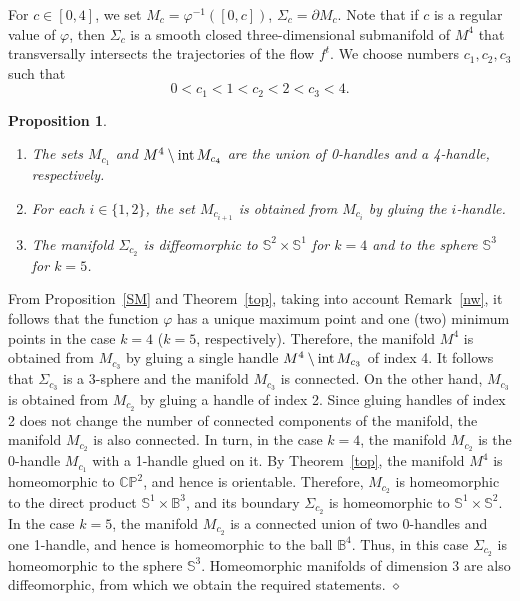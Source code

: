 \documentclass[%
 aip,
 amsmath,amssymb,
preprint,%
]{revtex4-1}
\newtheorem{propos}{Proposition}
\newenvironment{proof}{{\bf Proof:}}
{\hfill $\diamond$\medskip}
\begin{document}
For $c\in [0,4]$, we set $M_c=\varphi^{-1}([0,c])$, $\Sigma_c=\partial M_c$. Note that if $c$ is a regular value of $\varphi$, then $\Sigma_{c}$ is a smooth closed three-dimensional submanifold of $M^4$ that transversally intersects the trajectories of the flow $f^t$. We choose numbers $c_1, c_2, c_3$ such that
\begin{equation}\label{const}
0<c_1<1<c_2<2<c_3<4.
\end{equation}

\begin{propos}\label{hd}
\begin{enumerate}
\item The sets $M_{c_1}$ and $M^4\setminus {\rm int}\,  M_{c_4}$ are the union of 0-handles and a 4-handle, respectively.
\item For each $i\in \{1,2\}$, the set $M_{c_{i+1}}$ is obtained from $M_{c_{i}}$ by gluing the $i$-handle.

\item The manifold
$\Sigma_{c_2}$ is diffeomorphic to $\mathbb S^2\times \mathbb S^1$ for $k=4$ and to the sphere $\mathbb S^3$ for $k=5$.
\end{enumerate}
\end{propos}
\begin{proof}
From Proposition~\ref{SM} and Theorem~\ref{top}, taking into account Remark~\ref{nw}, it follows that the function $\varphi$ has a unique maximum point and one (two) minimum points in the case $k=4$ ($k=5$, respectively). Therefore, the manifold $M^4$ is obtained from $M_{c_3}$ by gluing a single handle $M^4\setminus {\rm int}\, M_{c_3}$ of index 4. It follows that $\Sigma_{c_3}$ is a $3$-sphere and the manifold $M_{c_3}$ is connected. On the other hand, $M_{c_3}$ is obtained from $M_{c_2}$ by gluing a handle of index 2. Since gluing handles of index 2 does not change the number of connected components of the manifold, the manifold $M_{c_2}$ is also connected. In turn, in the case $k=4$, the manifold $M_{c_2}$ is the $0$-handle  $M_{c_1}$ with a 1-handle glued on it. By Theorem~\ref{top}, the manifold $M^4$ is homeomorphic to $\mathbb {CP}^2$, and hence is orientable. Therefore, $M_{c_2}$ is homeomorphic to the direct product $\mathbb S^1\times \mathbb B^3$, and its boundary $\Sigma_{c_2}$ is homeomorphic to $\mathbb S^1\times \mathbb S^2$. In the case $k=5$, the manifold $M_{c_2}$ is a connected union of two 0-handles and one 1-handle, and hence is homeomorphic to the ball $\mathbb B^4$. Thus, in this case $\Sigma_{c_2}$ is homeomorphic to the sphere $\mathbb S^3$. Homeomorphic manifolds of dimension 3 are also diffeomorphic, from which we obtain the required statements.
\end{proof}
\end{document}
